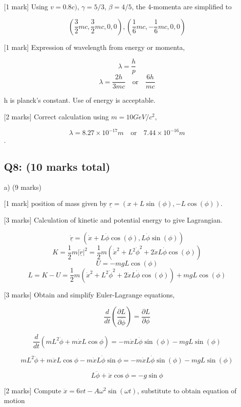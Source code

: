 \documentclass[a4paper,11pt]{article}
\begin{document}
[1 mark] Using \( v = 0.8 c ) \), \( \gamma = 5 / 3 \), \( \beta = 4 / 5 \), the 4-momenta are simplified to 

\[ 
\left ( \frac{3}{2}mc, \frac{3}{2}mc, 0,0 \right), \left ( \frac{1}{6}mc, -\frac{1}{6}mc,0,0 \right)
\]

[1 mark] Expression of wavelength from energy or momenta, 

\[ \lambda  = \frac{h}{p} \]
\[ \lambda = \frac{2h}{3mc} \quad \text{or} \quad \frac{6h}{mc} \]

h is planck’s constant. Use of energy is acceptable. 

[2 marks] Correct calculation using \( m = 10 GeV / c^2 \), 

\[
\lambda = 8.27 \times 10^{-17} m \quad \text{or} \quad 7.44 \times 10^{-16} m
\].

\subsection*{Q8: (10 marks total)}

a) (9 marks)

[1 mark] position of mass given by \( \underline{r} = (x + L \sin(\phi), -L \cos(\phi)) \). 

[3 marks] Calculation of kinetic and potential energy to give Lagrangian. 

\[ \dot{\underline{r}} = (\dot{x} + L\dot{\phi}\cos(\phi), L\dot{\phi}\sin(\phi) ) \]
\[ K = \frac{1}{2}m |\dot{\underline{r}}|^2 = \frac{1}{2}m (\dot{x}^2 + L^2 \dot{\phi}^2 + 2\dot{x}L\dot{\phi}\cos(\phi) ) \]
\[ U = -mgL \cos(\phi) \]
\[ L = K - U = \frac{1}{2}m \left(\dot{x}^2 + L^2 \dot{\phi}^2 + 2\dot{x}L\dot{\phi}\cos(\phi) \right) + mgL \cos(\phi) \]

[3 marks] Obtain and simplify Euler-Lagrange equations, 

\[ \frac{d}{dt}\left ( \frac{\partial L}{\partial \dot{\phi}} \right ) = \frac{\partial L}{\partial \phi} \]

\[ \frac{d}{dt} \left ( mL^2\dot{\phi} + m\dot{x}L\cos{\phi} \right ) = -m\dot{x}L\dot{\phi}\sin(\phi) - mgL\sin(\phi) \]

\[ mL^2 \ddot{\phi} + m\ddot{x}L\cos{\phi} - m\dot{x}L\dot{\phi}\sin{\phi} = -m\dot{x}L\dot{\phi}\sin(\phi) - mgL\sin(\phi) \]

\[ L \ddot{\phi} + \ddot{x}\cos{\phi} = - g\sin{\phi} \]

[2 marks] Compute \( \ddot{x} = 6vt - A \omega^2 \sin(\omega t) \), substitute to obtain equation of motion
\end{document}
